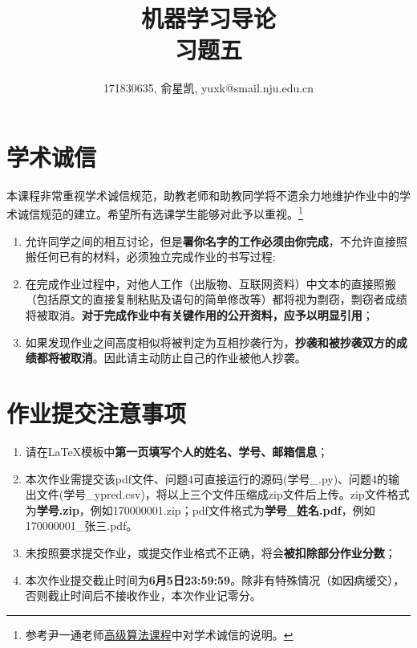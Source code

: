 \documentclass[a4paper,UTF8]{article}
\theoremstyle{definition}
\begin{document}
\title{机器学习导论\\习题五}
\author{171830635, 俞星凯, yuxk@smail.nju.edu.cn}
\maketitle


\section*{学术诚信}

本课程非常重视学术诚信规范，助教老师和助教同学将不遗余力地维护作业中的学术诚信规范的建立。希望所有选课学生能够对此予以重视。\footnote{参考尹一通老师\href{http://tcs.nju.edu.cn/wiki/}{高级算法课程}中对学术诚信的说明。}

\begin{tcolorbox}
	\begin{enumerate}
		\item[(1)] 允许同学之间的相互讨论，但是{\color{red}\textbf{署你名字的工作必须由你完成}}，不允许直接照搬任何已有的材料，必须独立完成作业的书写过程;
		\item[(2)] 在完成作业过程中，对他人工作（出版物、互联网资料）中文本的直接照搬（包括原文的直接复制粘贴及语句的简单修改等）都将视为剽窃，剽窃者成绩将被取消。{\color{red}\textbf{对于完成作业中有关键作用的公开资料，应予以明显引用}}；
		\item[(3)] 如果发现作业之间高度相似将被判定为互相抄袭行为，{\color{red}\textbf{抄袭和被抄袭双方的成绩都将被取消}}。因此请主动防止自己的作业被他人抄袭。
	\end{enumerate}
\end{tcolorbox}

\section*{作业提交注意事项}
\begin{tcolorbox}
	\begin{enumerate}
		\item[(1)] 请在LaTeX模板中{\color{red}\textbf{第一页填写个人的姓名、学号、邮箱信息}}；
		\item[(2)] 本次作业需提交该pdf文件、问题4可直接运行的源码(学号\_.py)、问题4的输出文件(学号\_ypred.csv)，将以上三个文件压缩成zip文件后上传。zip文件格式为{\color{red}\textbf{学号.zip}}，例如170000001.zip；pdf文件格式为{\color{red}\textbf{学号\_姓名.pdf}}，例如170000001\_张三.pdf。
		\item[(3)] 未按照要求提交作业，或提交作业格式不正确，将会{\color{red}\textbf{被扣除部分作业分数}}；
		\item[(4)] 本次作业提交截止时间为{\color{red}\textbf{6月5日23:59:59}}。除非有特殊情况（如因病缓交），否则截止时间后不接收作业，本次作业记零分。
	\end{enumerate}
\end{tcolorbox}
\end{document}
